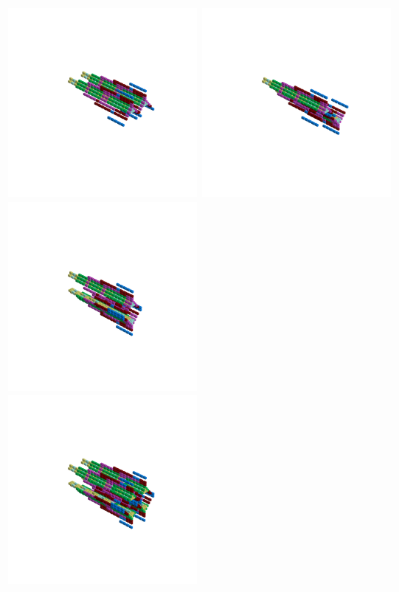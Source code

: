 \begin{minipage}[b]{0.48\linewidth}                                       
  \begin{figure}[H]
      \centering
        \vspace*{-1cm}
        \hspace*{-2cm}
        \includegraphics[width=5cm]{src/symmetries/pattern4_1-45.png}%
        \hspace*{-3cm}
        \includegraphics[width=5cm]{src/symmetries/pattern4_2-45.png}\\
        \vspace*{-3cm}
        \hspace*{-4cm}
        \includegraphics[width=5cm]{src/symmetries/pattern4_3-45.png} \\
        \vspace*{-5cm}
        \includegraphics[width=5cm]{src/symmetries/pattern4_4-45.png}
        \vspace*{-1cm}
  \caption*{}
  \end{figure}
\end{minipage}

